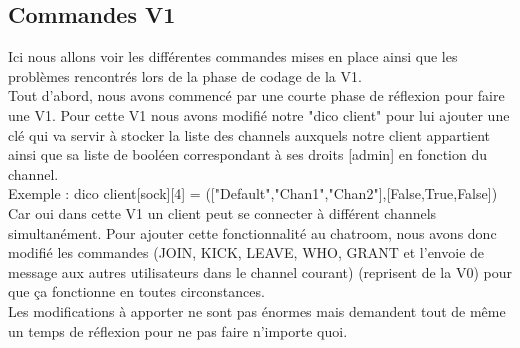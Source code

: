 \documentclass[12pt]{article}
\begin{document}
\subsection{Commandes V1}
Ici nous allons voir les différentes commandes mises en place ainsi que les problèmes rencontrés lors de la phase de codage de la V1.\\
Tout d'abord, nous avons commencé par une courte phase de réflexion pour faire une V1. Pour cette V1 nous avons modifié notre "dico client" pour lui ajouter une clé qui va servir à stocker la liste des channels auxquels notre client appartient ainsi que sa liste de booléen correspondant à ses droits [admin] en fonction du channel.\\
Exemple :  dico client[sock][4] = (["Default","Chan1","Chan2"],[False,True,False]) 
Car oui dans cette V1 un client peut se connecter à différent channels simultanément. Pour ajouter cette fonctionnalité au chatroom, nous avons donc modifié les commandes (JOIN, KICK, LEAVE, WHO, GRANT et l'envoie de message aux autres utilisateurs dans le channel courant) (reprisent de la V0) pour que ça fonctionne en toutes circonstances.\\
Les modifications à apporter ne sont pas énormes mais demandent tout de même un temps de réflexion pour ne pas faire n'importe quoi.\\
\end{document}
